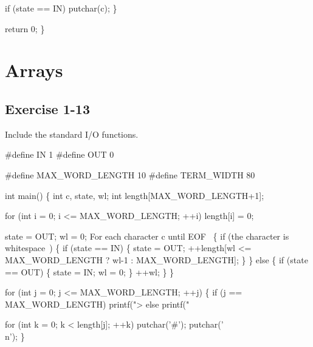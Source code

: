         if (state == IN)
            putchar(c);
    \}


    return 0;
\}
\nwendcode{}\nwdocspar
\nwenddocs{}\section{Arrays}

\subsection{Exercise 1-13}


\nwenddocs{}\endmoddef{}
\LA{}Include the standard I/O functions.~{\nwtagstyle{}}\RA{}


#define IN    1
#define OUT   0

#define MAX_WORD_LENGTH 10
#define TERM_WIDTH 80


int main()
\{
    int c, state, wl;
    int length[MAX_WORD_LENGTH+1];

    for (int i = 0; i <= MAX_WORD_LENGTH; ++i)
        length[i] = 0;

    state = OUT;
    wl = 0;
    \LA{}For each character \code{}c\edoc{} until \code{}EOF\edoc{}~{\nwtagstyle{}}\RA{} \{
        if (\LA{}the character is whitespace~{\nwtagstyle{}}\RA{}) \{
            if (state == IN) \{
                state = OUT;
                ++length[wl <= MAX_WORD_LENGTH ? wl-1 : MAX_WORD_LENGTH];
            \}
        \} else \{
            if (state == OUT) \{
                state = IN;
                wl = 0;
            \}
            ++wl;
        \}
    \}

    for (int j = 0; j <= MAX_WORD_LENGTH; ++j) \{
        if (j == MAX_WORD_LENGTH)
            printf(">%
        else
            printf(" %

        for (int k = 0; k < length[j]; ++k)
            putchar('#');
        putchar('\\n');
    \}


